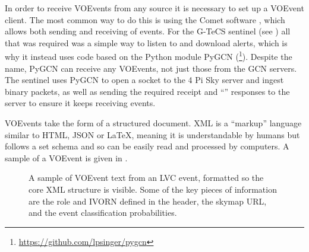 \begin{colsection}
\begin{colsection}
In order to receive VOEvents from any source it is necessary to set up a VOEvent client. The most common way to do this is using the Comet software \citep{comet}, which allows both sending and receiving of events. For the G-TeCS sentinel (see ) all that was required was a simple way to listen to and download alerts, which is why it instead uses code based on the Python module PyGCN (\footnote{\url{https://github.com/lpsinger/pygcn}}). Despite the name, PyGCN can receive any VOEvents, not just those from the GCN servers. The sentinel uses PyGCN to open a socket to the 4 Pi Sky server and ingest binary packets, as well as sending the required receipt and ``'' responses to the server to ensure it keeps receiving events.

VOEvents take the form of a structured  document. XML is a ``markup'' language similar to HTML, JSON or \LaTeX, meaning it is understandable by humans but follows a set schema and so can be easily read and processed by computers. A sample of a VOEvent is given in .

\begin{figure}[p]
    
    \caption[VOEvent XML sample]{
        A sample of VOEvent text from an LVC event, formatted so the core XML structure is visible. Some of the key pieces of information are the role and IVORN defined in the header, the skymap URL, and the event classification probabilities.
    }\label{fig:voevent_xml}
\end{figure}

\newpage

\end{colsection}


\end{colsection}


\newpage
